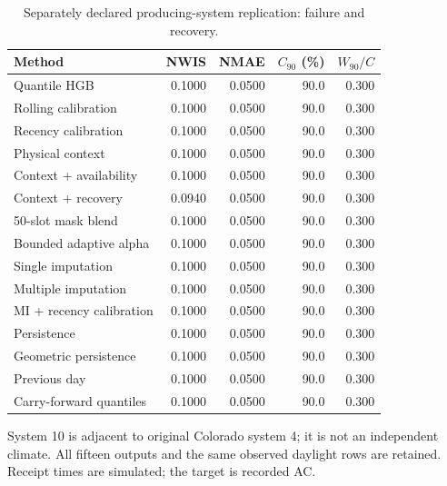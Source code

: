 \begin{table}[t]
\centering\footnotesize
\caption{Separately declared producing-system replication: failure and recovery.}
\label{tab:extension-methods}
\setlength{\tabcolsep}{4pt}
\begin{tabular}{lrrrr}
\hline
Method & NWIS & NMAE & $C_{90}$ (\%) & $W_{90}/C$ \\
\hline
Quantile HGB & 0.1000 & 0.0500 & 90.0 & 0.300 \\
Rolling calibration & 0.1000 & 0.0500 & 90.0 & 0.300 \\
Recency calibration & 0.1000 & 0.0500 & 90.0 & 0.300 \\
Physical context & 0.1000 & 0.0500 & 90.0 & 0.300 \\
Context + availability & 0.1000 & 0.0500 & 90.0 & 0.300 \\
Context + recovery & 0.0940 & 0.0500 & 90.0 & 0.300 \\
50-slot mask blend & 0.1000 & 0.0500 & 90.0 & 0.300 \\
Bounded adaptive alpha & 0.1000 & 0.0500 & 90.0 & 0.300 \\
Single imputation & 0.1000 & 0.0500 & 90.0 & 0.300 \\
Multiple imputation & 0.1000 & 0.0500 & 90.0 & 0.300 \\
MI + recency calibration & 0.1000 & 0.0500 & 90.0 & 0.300 \\
Persistence & 0.1000 & 0.0500 & 90.0 & 0.300 \\
Geometric persistence & 0.1000 & 0.0500 & 90.0 & 0.300 \\
Previous day & 0.1000 & 0.0500 & 90.0 & 0.300 \\
Carry-forward quantiles & 0.1000 & 0.0500 & 90.0 & 0.300 \\
\hline
\end{tabular}
\par\smallskip
\begin{minipage}{\textwidth}\scriptsize
System 10 is adjacent to original Colorado system 4; it is not an independent climate. All fifteen outputs and the same observed daylight rows are retained. Receipt times are simulated; the target is recorded AC.
\end{minipage}
\end{table}
